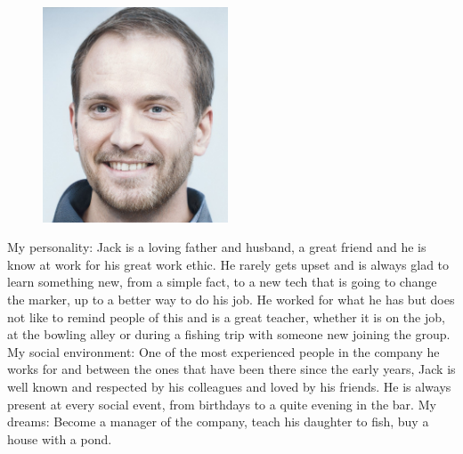 \begin{figure}
\includegraphics[width=5.5cm]{Img/Jack.jpg}
\end{figure} 


My personality: 
\newline
Jack is a loving father and husband, a great friend and he is know at work for his great work ethic. He rarely gets upset and is always glad to learn something new, from a simple fact, to a new tech that is going to change the marker, up to a better way to do his job. He worked for what he has but does not like to remind people of this and is a great teacher, whether it is on the job, at the bowling alley or during a fishing trip with someone new joining the group. 
\newline
My social environment: 
\newline
One of the most experienced people in the company he works for and between the ones that have been there since the early years, Jack is well known and respected by his colleagues and loved by his friends. He is always present at every social event, from birthdays to a quite evening in the bar. 
\newline
My dreams: 
\newline
Become a manager of the company, teach his daughter to fish, buy a house with a pond.
